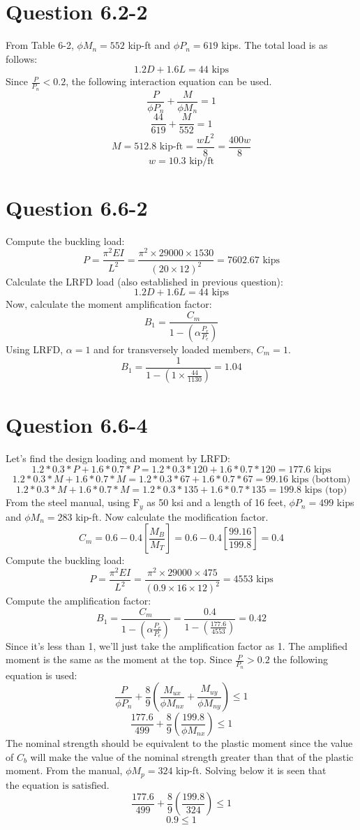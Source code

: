 \documentclass{article}
\begin{document}
\section*{Question 6.2-2}
From Table 6-2, $\phi M_n=552$ kip-ft and $\phi P_n=619$ kips. The total load is as follows: 
\[1.2D + 1.6L = 44\text{ kips}\] 
Since $\frac{P}{P_n}<0.2$, the following interaction equation can be used. 
\[\frac{P}{\phi P_n}+\frac{M}{\phi M_n}=1\]
\[\frac{44}{619}+\frac{M}{552}=1\]
\[M=512.8\text{ kip-ft}=\frac{wL^2}{8}=\frac{400w}{8}\] 
\[w=\boxed{10.3 \text{ kip/ft}}\]
\section*{Question 6.6-2}
Compute the buckling load:
\[P=\frac{\pi^2EI}{L^2}=\frac{\pi^2\times 29000\times 1530}{(20\times 12)^2}=7602.67\text{ kips}\]
Calculate the LRFD load (also established in previous question): 
\[1.2D + 1.6L = 44\text{ kips}\]
Now, calculate the moment amplification factor: 
\[B_1=\frac{C_m}{1-\left(\alpha\frac{P_r}{P_e}\right)}\] 
Using LRFD, $\alpha=1$ and for transversely loaded members, $C_m=1$.
\[B_1=\frac{1}{1-\left(1\times\frac{44}{1130}\right)}=\boxed{1.04}\]  
\section*{Question 6.6-4}
Let's find the design loading and moment by LRFD:
\[1.2*0.3*P+1.6*0.7*P=1.2*0.3*120+1.6*0.7*120=177.6\text{ kips}\] 
\[1.2*0.3*M+1.6*0.7*M=1.2*0.3*67+1.6*0.7*67=99.16\text{ kips (bottom)}\]
\[1.2*0.3*M+1.6*0.7*M=1.2*0.3*135+1.6*0.7*135=199.8\text{ kips (top)}\]
From the steel manual, using $\text{F}_y$ as 50 ksi and a length of 16 feet, $\phi P_n=499$ kips and $\phi M_n=283$ kip-ft. Now calculate the modification factor.
\[C_m=0.6-0.4\left[\frac{M_B}{M_T}\right]=0.6-0.4\left[\frac{99.16}{199.8}\right]=0.4\]
Compute the buckling load: 
\[P=\frac{\pi^2EI}{L^2}=\frac{\pi^2\times 29000\times 475}{(0.9\times 16\times 12)^2}=4553\text{ kips}\]
Compute the amplification factor: 
\[B_1=\frac{C_m}{1-\left(\alpha\frac{P_r}{P_e}\right)}=\frac{0.4}{1-\left(\frac{177.6}{4553}\right)}=0.42\] 
Since it's less than 1, we'll just take the amplification factor as 1. The amplified moment is the same as the moment at the top. Since $\frac{P}{P_n}>0.2$ the following equation is used: 
\[\frac{P}{\phi P_n}+\frac{8}{9}\left(\frac{M_{ux}}{\phi M_{nx}}+\frac{M_{uy}}{\phi M_{ny}}\right)\leq 1\]
\[\frac{177.6}{499}+\frac{8}{9}\left(\frac{199.8}{\phi M_{nx}}\right)\leq 1\]
The nominal strength should be equivalent to the plastic moment since the value of $C_b$ will make the value of the nominal strength greater than that of the plastic moment. From the manual, $\phi M_p=324$ kip-ft. Solving below it is seen that $\boxed{\text{the equation is satisfied}}$.
\[\frac{177.6}{499}+\frac{8}{9}\left(\frac{199.8}{324}\right)\leq 1\]
\[0.9 \leq 1\]
\end{document}

